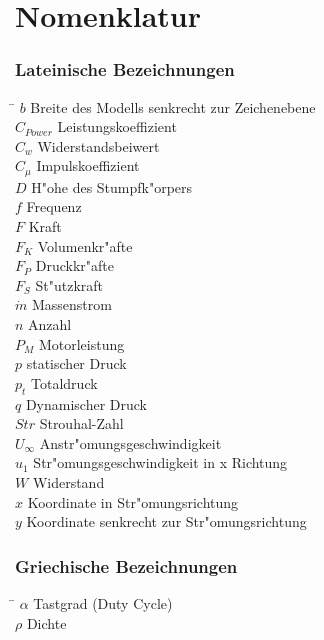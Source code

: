 \chapter*{Nomenklatur}

\subsection*{Lateinische Bezeichnungen}
\begin{tabbing}
\hspace*{2cm}\=\kill
$b$ \> Breite des Modells senkrecht zur Zeichenebene \\[0.2ex]
$C_{Power}$ \> Leistungskoeffizient \\[0.2ex]
$C_w$ \> Widerstandsbeiwert \\[0.2ex]
$C_{\mu}$ \> Impulskoeffizient \\[0.2ex]
$D$ \> H"ohe des Stumpfk"orpers \\[0.2ex]
$f$ \> Frequenz \\[0.2ex]
$F$ \> Kraft \\[0.2ex]
$F_{K}$ \> Volumenkr"afte \\[0.2ex]
$F_{P}$ \> Druckkr"afte \\[0.2ex]
$F_{S}$ \> St"utzkraft \\[0.2ex]
$\dot{m}$ \> Massenstrom \\[0.2ex]
$n$ \> Anzahl \\[0.2ex]
$P_M$ \> Motorleistung \\[0.2ex]
$p$ \> statischer Druck \\[0.2ex]
$p_t$ \> Totaldruck \\[0.2ex]
$q$ \> Dynamischer Druck \\[0.2ex]
$Str$ \> Strouhal-Zahl \\[0.2ex]
$U_{\infty}$ \> Anstr"omungsgeschwindigkeit \\[0.2ex]
$u_1$ \> Str"omungsgeschwindigkeit in x Richtung \\[0.2ex]
$W$ \> Widerstand \\[0.2ex]
$x$ \> Koordinate in Str"omungsrichtung \\[0.2ex]
$y$ \> Koordinate senkrecht zur Str"omungsrichtung \\[0.2ex]
\end{tabbing}



\subsection*{Griechische Bezeichnungen}
\begin{tabbing}
\hspace*{2cm}\=\kill
$\alpha$ \> Tastgrad (Duty Cycle) \\[0.2ex]
$\rho$ \> Dichte \\[0.2ex]

\end{tabbing}



